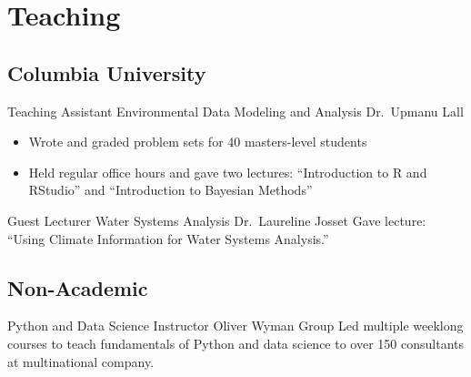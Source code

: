 \section{Teaching}

\subsection{Columbia University}

{Teaching Assistant}
{Environmental Data Modeling and Analysis}
{Dr.~Upmanu Lall}
{}
{
	\begin{itemize}
		\item Wrote and graded problem sets for 40 masters-level students
		\item Held regular office hours and gave two lectures: ``Introduction to R and RStudio'' and ``Introduction to Bayesian Methods''
	\end{itemize}
}

{Guest Lecturer}
{Water Systems Analysis}
{Dr.~Laureline Josset}
{}
{Gave lecture: ``Using Climate Information for Water Systems Analysis.''}

\subsection{Non-Academic}

{Python and Data Science Instructor}
{Oliver Wyman Group}
{}
{}
{Led multiple weeklong courses to teach fundamentals of Python and data science to over 150 consultants at multinational company.}